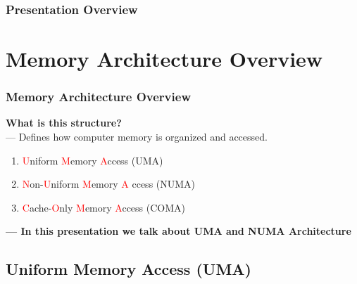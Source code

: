 \documentclass[
	12pt, %
]{beamer}
\begin{document}
\begin{frame}
	\frametitle{Presentation Overview} %
	
	\tableofcontents %
\end{frame}


\section{Memory Architecture Overview}



\begin{frame}
	\frametitle{Memory Architecture Overview}
	\textbf{What is this structure?}\\
	--- Defines how computer memory is organized and accessed.\\
	\begin{enumerate}
		\item \textcolor{red}{U}niform \textcolor{red}{M}emory \textcolor{red}{A}ccess (UMA) 
		\item \textcolor{red}{N}on-\textcolor{red}{U}niform \textcolor{red}{M}emory \textcolor{red}{A	}ccess (NUMA)
		\item \textcolor{red}{C}ache-\textcolor{red}{O}nly \textcolor{red}{M}emory \textcolor{red}{A}ccess (COMA)
	\end{enumerate}
	
	\textbf{--- In this presentation we talk about UMA and NUMA Architecture}
\end{frame}




\subsection{Uniform Memory Access (UMA)}
\end{document}

